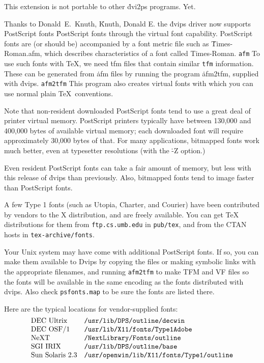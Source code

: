 This extension is not portable to other \.{dvi2ps} programs.  Yet.


Thanks to Donald~E.~Knuth,
\^{Knuth, Donald E.}
the \.{dvips} driver now supports PostScript fonts
\^{PostScript fonts}
through the virtual font capability.
PostScript fonts are (or should be) accompanied by a font metric file
such as \.{Times-Roman.afm},
which describes characteristics of a font called Times-Roman.
\^{{\tt afm}}
To use such fonts with \TeX, we need \.{tfm} files that contain similar
\^{{\tt tfm}}
information. These can be generated from \.{afm} files
by running the program \.{afm2tfm}, supplied with \.{dvips}.
\^{{\tt afm2tfm}}
This program also creates virtual fonts with which you can use normal
plain \TeX\ conventions.

Note that non-resident downloaded PostScript fonts tend to use a
great deal of printer virtual memory.  PostScript printers typically
have between 130,000 and 400,000 bytes of available virtual memory;
each downloaded font will require approximately 30,000 bytes of
that.  For many applications, bitmapped fonts work much better,
even at typesetter resolutions (with the \.{-Z} option.)

Even resident PostScript fonts can take a fair amount of memory,
but less with this release of \.{dvips} than previously.  Also,
bitmapped fonts tend to image faster than PostScript fonts.

A few Type 1 fonts (such as Utopia, Charter, and Courier) have been
contributed by vendors to the X distribution, and are freely
available. You can get \TeX{} distributions for them from
{\tt ftp.cs.umb.edu} in {\tt pub/tex}, and from the CTAN hosts in
{\tt tex-archive/fonts}.

Your Unix system may have come with additional PostScript fonts.  If so,
you can make them available to Dvips by copying the files or making
symbolic links with the appropriate filenames, and running
{\tt afm2tfm} to make TFM and VF files so the fonts
will be available in the same encoding as the fonts distributed with
dvips. Also check {\tt psfonts.map} to be sure the fonts are listed
there.

Here are the typical locations for vendor-supplied fonts:
$$\vtop{\halign{#\hfil\quad&\tt #\hfil\cr
DEC Ultrix& /usr/lib/DPS/outline/decwin\cr
DEC OSF/1& /usr/lib/X11/fonts/Type1Adobe\cr
NeXT& /NextLibrary/Fonts/outline\cr
SGI IRIX& /usr/lib/DPS/outline/base\cr
Sun Solaris 2.3& /usr/openwin/lib/X11/fonts/Type1/outline\cr}}$$

